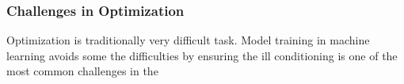 \subsubsection{Challenges in Optimization}

Optimization is traditionally very difficult task. Model training in machine learning avoids some the difficulties by ensuring 
the ill conditioning is one of the most common challenges in the 